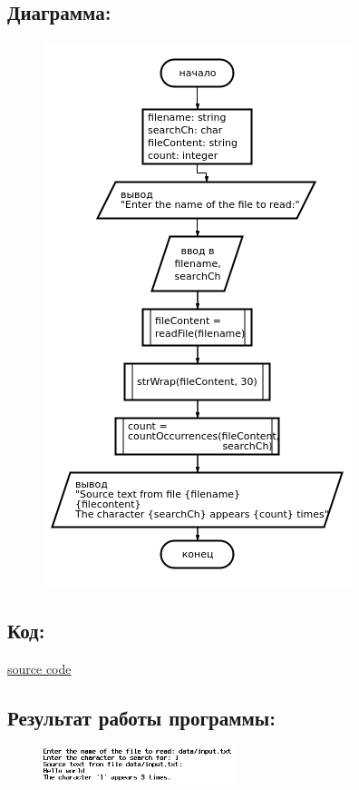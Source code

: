 \documentclass[14pt,a4paper]{article}
\begin{document}
\subsection{Диаграмма:}
\begin{figure}[H]
  \centering
  \includegraphics[height=0.5\textheight]{data/diagram18_3b.png}
\end{figure}
\subsection{Код:}

\href{https://raw.githubusercontent.com/John1400800/stuff/refs/heads/main/c_learning/home_works/task18_3b.cpp}{source code}
\subsection{Результат работы программы:}
\begin{figure}[H]
  \includegraphics[width=0.5\textwidth]{data/demo18_3b.png}
\end{figure}
\end{document}

